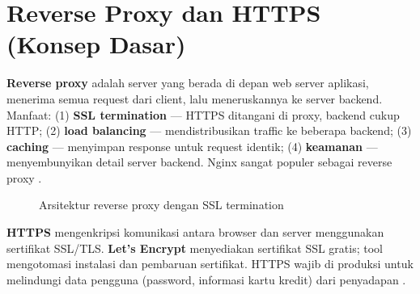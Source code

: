 \section{Reverse Proxy dan HTTPS (Konsep Dasar)}

\textbf{Reverse proxy} adalah server yang berada di depan web server aplikasi, menerima semua request dari client, lalu meneruskannya ke server backend. Manfaat: (1) \textbf{SSL termination} --- HTTPS ditangani di proxy, backend cukup HTTP; (2) \textbf{load balancing} --- mendistribusikan traffic ke beberapa backend; (3) \textbf{caching} --- menyimpan response untuk request identik; (4) \textbf{keamanan} --- menyembunyikan detail server backend. Nginx sangat populer sebagai reverse proxy \cite{mdnDeploy}.

\begin{figure}[ht]
\centering
{}
\caption{Arsitektur reverse proxy dengan SSL termination}
\end{figure}

\textbf{HTTPS} mengenkripsi komunikasi antara browser dan server menggunakan sertifikat SSL/TLS. \textbf{Let's Encrypt} menyediakan sertifikat SSL gratis; tool  mengotomasi instalasi dan pembaruan sertifikat. HTTPS wajib di produksi untuk melindungi data pengguna (password, informasi kartu kredit) dari penyadapan \cite{mdnDeploy}.

